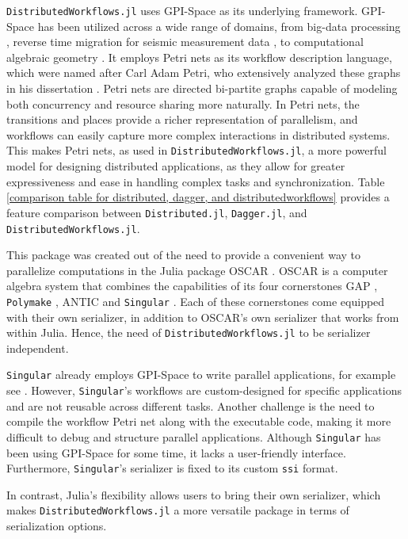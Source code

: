 \documentclass{juliacon}
\begin{document}
\texttt{DistributedWorkflows.jl} uses GPI-Space \cite{GSPC} as its underlying framework.
GPI-Space has been utilized across a wide range of domains, from big-data processing \cite{gpispace_paper_mapreduce}, reverse time migration for seismic measurement data \cite{gpispace_paper_seismic}, to computational algebraic geometry \cite{gpispace_paper_singular}.
It employs Petri nets as its workflow description language, which were named after Carl Adam Petri, who extensively analyzed these graphs in his dissertation \cite{petri_nets}.
Petri nets are directed bi-partite graphs capable of modeling both concurrency and resource sharing more naturally.
In Petri nets, the transitions and places provide a richer representation of parallelism, and workflows can easily capture more complex interactions in distributed systems. 
This makes Petri nets, as used in \texttt{DistributedWorkflows.jl}, a more powerful model for designing distributed applications, as they allow for greater expressiveness and ease in handling complex tasks and synchronization.
Table \ref{comparison table for distributed, dagger, and distributedworkflows} provides a feature comparison between \texttt{Distributed.jl}, \texttt{Dagger.jl}, and \texttt{DistributedWorkflows.jl}.\vskip 6pt

This package was created out of the need to provide a convenient way to parallelize computations in the Julia package OSCAR \cite{OSCAR}. OSCAR is a computer algebra system that combines the capabilities of its four cornerstones GAP \cite{GAP4}, \texttt{Polymake} \cite{Polymake}, ANTIC %
and \texttt{Singular} \cite{DGPS_Singular}. Each of these cornerstones come equipped with their own serializer, in addition to OSCAR's own serializer that works from within Julia. Hence, the need of \texttt{DistributedWorkflows.jl} to be serializer independent.\vskip 6pt

\texttt{Singular} already employs GPI-Space to write parallel applications, for example see \cite{gpispace_paper_singular}. 
However, \texttt{Singular}’s workflows are custom-designed for specific applications and are not reusable across different tasks. 
Another challenge is the need to compile the workflow Petri net along with the executable code, making it more difficult to debug and structure parallel applications. 
Although \texttt{Singular} has been using GPI-Space for some time, it lacks a user-friendly interface. 
Furthermore, \texttt{Singular}’s serializer is fixed to its custom \verb+ssi+ format.\vskip 6pt

In contrast, Julia’s flexibility allows users to bring their own serializer, which makes \texttt{DistributedWorkflows.jl} a more versatile package in terms of serialization options.\vskip 6pt
\end{document}
